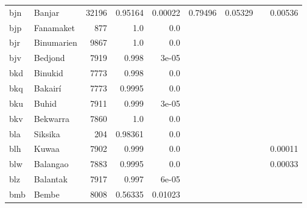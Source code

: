 \documentclass[11pt]{article}
\begin{document}
\begin{table*}[ht]
{\begin{tabular}{llrrrrrrr}
bjn         & Banjar         & 32196         & 0.95164         & 0.00022         & 0.79496         & 0.05329         &          & 0.00536         \\

bjp         & Fanamaket         & 877         & 1.0         & 0.0         &          &          &          &          \\

bjr         & Binumarien         & 9867         & 1.0         & 0.0         &          &          &          &          \\

bjv         & Bedjond         & 7919         & 0.998         & 3e-05         &          &          &          &          \\

bkd         & Binukid         & 7773         & 0.998         & 0.0         &          &          &          &          \\

bkq         & Bakairí         & 7773         & 0.9995         & 0.0         &          &          &          &          \\

bku         & Buhid         & 7911         & 0.999         & 3e-05         &          &          &          &          \\

bkv         & Bekwarra         & 7860         & 1.0         & 0.0         &          &          &          &          \\

bla         & Siksika         & 204         & 0.98361         & 0.0         &          &          &          &          \\

blh         & Kuwaa         & 7902         & 0.999         & 0.0         &          &          &          & 0.00011         \\

blw         & Balangao         & 7883         & 0.9995         & 0.0         &          &          &          & 0.00033         \\

blz         & Balantak         & 7917         & 0.997         & 6e-05         &          &          &          &          \\

bmb         & Bembe         & 8008         & 0.56335         & 0.01023         &          &          &          &          \\


\end{tabular}}
\end{table*}
\end{document}
